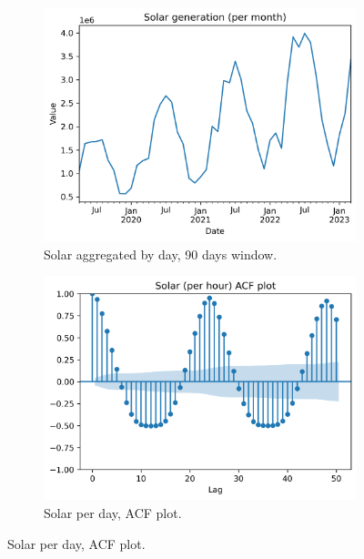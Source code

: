 \begin{figure}[H]\ContinuedFloat
    \begin{subfigure}{.44\textwidth}
        \centering
        \includegraphics[width=1\linewidth]{images/variable_analysis/esios_generation_solar_m_48}
        \caption{Solar aggregated by day, 90 days window.}
        \label{fig:solar-series}
    \end{subfigure}
    \begin{subfigure}{.45\textwidth}
        \centering
        \includegraphics[width=1\linewidth]{images/variable_analysis/esios_generation_solar_h_acf}
        \caption{Solar per day, ACF plot.}
        \label{fig:solar-acf}
    \end{subfigure}
\end{figure}

